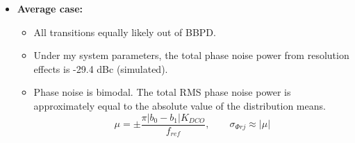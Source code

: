 			\begin{itemize}[itemsep=4pt,label=\protect---]

				\item \textbf{Average case:}
				\begin{itemize}[itemsep=4pt,label=\protect$\bullet$]
					\item All transitions equally likely out of BBPD.
					\item Under my system parameters, the total phase noise power from resolution effects is -29.4 dBc (simulated).
					\item Phase noise is bimodal. The total RMS phase noise power is approximately equal to the absolute value of the distribution means.
					\begin{equation}
						\mu = \pm\frac{\pi|b_0-b_1|K_{DCO}}{f_{ref}}, \hspace{2em}\sigma_{\Phi rj} \approx |\mu|
					\end{equation}
				\end{itemize}
			\end{itemize}
	\vspace{-3em}
